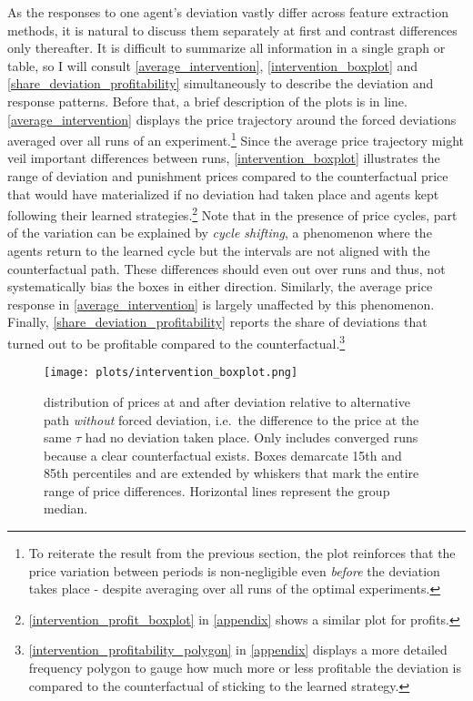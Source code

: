 As the responses to one agent's deviation vastly differ across feature extraction methods, it is natural to discuss them separately at first and contrast differences only thereafter.  It is difficult to summarize all information in a single graph or table, so I will consult \autoref{average_intervention}, \autoref{intervention_boxplot} and \autoref{share_deviation_profitability} simultaneously to describe the deviation and response patterns. Before that, a brief description of the plots is in line. \autoref{average_intervention} displays the price trajectory around the forced deviations averaged over all runs of an experiment.\footnote{To reiterate the result from the previous section, the plot reinforces that the price variation between periods is non-negligible even \emph{before} the deviation takes place - despite averaging over all runs of the optimal experiments.}  Since the average price trajectory might veil important differences between runs, \autoref{intervention_boxplot} illustrates the range of deviation and punishment prices compared to the counterfactual price that would have materialized if no deviation had taken place and agents kept following their learned strategies.\footnote{\autoref{intervention_profit_boxplot} in \autoref{appendix} shows a similar plot for profits.} Note that in the presence of price cycles, part of the variation can be explained by \emph{cycle shifting}, a phenomenon where the agents return to the learned cycle but the intervals are not aligned with the counterfactual path. These differences should even out over runs and thus, not systematically bias the boxes in either direction. Similarly, the average price response in \autoref{average_intervention} is largely unaffected by this phenomenon. Finally, \autoref{share_deviation_profitability} reports the share of deviations that turned out to be profitable compared to the counterfactual.\footnote{\autoref{intervention_profitability_polygon} in \autoref{appendix} displays a more detailed frequency polygon to gauge how much more or less profitable the deviation is compared to the counterfactual of sticking to the learned strategy.}

\begin{figure}
	\texttt{[image: plots/intervention\_boxplot.png]}
	\caption{distribution of prices at and after deviation relative to alternative path \emph{without} forced deviation, i.e.\ the difference to the price at the same $\tau$ had no deviation taken place. Only includes converged runs because a clear counterfactual exists. Boxes demarcate 15th and 85th percentiles and are extended by whiskers that mark the entire range of price differences. Horizontal lines represent the group median.}
	\label{intervention_boxplot}
\end{figure}

